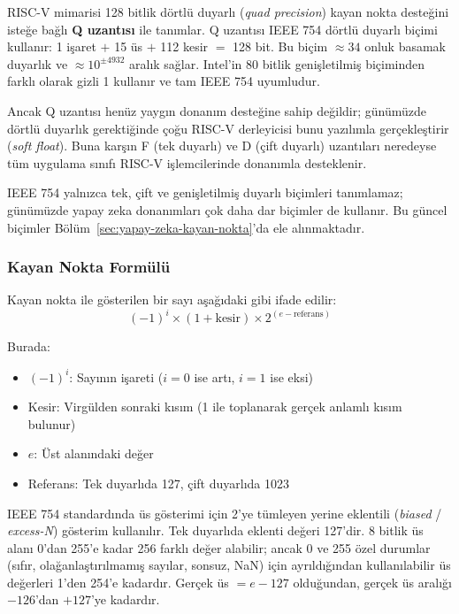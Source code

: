 \begin{bilginot}
RISC-V mimarisi 128 bitlik dörtlü duyarlı (\emph{quad precision}) kayan nokta desteğini isteğe bağlı \textbf{Q uzantısı} ile tanımlar. Q uzantısı IEEE 754 dörtlü duyarlı biçimi kullanır: 1 işaret $+$ 15 üs $+$ 112 kesir $=$ 128 bit. Bu biçim $\approx 34$ onluk basamak duyarlık ve $\approx 10^{\pm 4932}$ aralık sağlar. Intel'in 80 bitlik genişletilmiş biçiminden farklı olarak gizli 1 kullanır ve tam IEEE 754 uyumludur.

Ancak Q uzantısı henüz yaygın donanım desteğine sahip değildir; günümüzde dörtlü duyarlık gerektiğinde çoğu RISC-V derleyicisi bunu yazılımla gerçekleştirir (\emph{soft float}). Buna karşın F (tek duyarlı) ve D (çift duyarlı) uzantıları neredeyse tüm uygulama sınıfı RISC-V işlemcilerinde donanımla desteklenir.
\end{bilginot}

IEEE 754 yalnızca tek, çift ve genişletilmiş duyarlı biçimleri tanımlamaz; günümüzde yapay zeka donanımları çok daha dar biçimler de kullanır. Bu güncel biçimler Bölüm~\ref{sec:yapay-zeka-kayan-nokta}'da ele alınmaktadır.

\subsubsection{Kayan Nokta Formülü}

Kayan nokta ile gösterilen bir sayı aşağıdaki gibi ifade edilir:
\begin{equation}
(-1)^i \times (1 + \text{kesir}) \times 2^{(e - \text{referans})}
\label{eq:kayan-nokta}
\end{equation}

Burada:
\begin{itemize}
\item $(-1)^i$: Sayının işareti ($i=0$ ise artı, $i=1$ ise eksi)
\item Kesir: Virgülden sonraki kısım (1 ile toplanarak gerçek anlamlı kısım bulunur)
\item $e$: Üst alanındaki değer
\item Referans: Tek duyarlıda 127, çift duyarlıda 1023
\end{itemize}

IEEE 754 standardında üs gösterimi için 2'ye tümleyen yerine eklentili (\emph{biased} / \emph{excess-N}) gösterim kullanılır. Tek duyarlıda eklenti değeri 127'dir. 8 bitlik üs alanı 0'dan 255'e kadar 256 farklı değer alabilir; ancak 0 ve 255 özel durumlar (sıfır, olağanlaştırılmamış sayılar, sonsuz, NaN) için ayrıldığından kullanılabilir üs değerleri 1'den 254'e kadardır. Gerçek üs $= e - 127$ olduğundan, gerçek üs aralığı $-126$'dan $+127$'ye kadardır.

